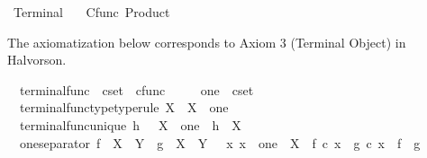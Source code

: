 %
\begin{isabellebody}%
%
%
\isadelimtheory
%
\endisadelimtheory
%
\isatagtheory
{}\isamarkupfalse%
\ Terminal\isanewline
\ \ \ Cfunc\ Product\isanewline
{}%
\endisatagtheory
{\isafoldtheory}%
%
\isadelimtheory
%
\endisadelimtheory
%
\isadelimdocument
%
\endisadelimdocument
%
\isatagdocument
%
\isamarkuptrue%
%
\endisatagdocument
{\isafolddocument}%
%
\isadelimdocument
%
\endisadelimdocument
%
\begin{isamarkuptext}%
The axiomatization below corresponds to Axiom 3 (Terminal Object) in Halvorson.%
\end{isamarkuptext}\isamarkuptrue%
\isamarkupfalse%
\isanewline
\ \ terminal{\isacharunderscore}{\kern0pt}func\ {\isacharcolon}{\kern0pt}{\isacharcolon}{\kern0pt}\ {\isachardoublequoteopen}cset\ {\isasymRightarrow}\ cfunc{\isachardoublequoteclose}\ {\isacharparenleft}{\kern0pt}{\isachardoublequoteopen}{\isasymbeta}\isactrlbsub {\isacharunderscore}{\kern0pt}\isactrlesub {\isachardoublequoteclose}\ {}{}{}{\isacharparenright}{\kern0pt}\ \isanewline
\ \ one\ {\isacharcolon}{\kern0pt}{\isacharcolon}{\kern0pt}\ {\isachardoublequoteopen}cset{\isachardoublequoteclose}\isanewline
{}\isanewline
\ \ terminal{\isacharunderscore}{\kern0pt}func{\isacharunderscore}{\kern0pt}type{\isacharbrackleft}{\kern0pt}type{\isacharunderscore}{\kern0pt}rule{\isacharbrackright}{\kern0pt}{\isacharcolon}{\kern0pt}\ {\isachardoublequoteopen}{\isasymbeta}\isactrlbsub X\isactrlesub \ {\isacharcolon}{\kern0pt}\ X\ {\isasymrightarrow}\ one{\isachardoublequoteclose}\ \isanewline
\ \ terminal{\isacharunderscore}{\kern0pt}func{\isacharunderscore}{\kern0pt}unique{\isacharcolon}{\kern0pt}\ {\isachardoublequoteopen}h\ {\isacharcolon}{\kern0pt}\ \ X\ {\isasymrightarrow}\ one\ {\isasymLongrightarrow}\ h\ {\isacharequal}{\kern0pt}\ {\isasymbeta}\isactrlbsub X\isactrlesub {\isachardoublequoteclose}\ \isanewline
\ \ one{\isacharunderscore}{\kern0pt}separator{\isacharcolon}{\kern0pt}\ {\isachardoublequoteopen}f\ {\isacharcolon}{\kern0pt}\ X\ {\isasymrightarrow}\ Y\ {\isasymLongrightarrow}\ g\ {\isacharcolon}{\kern0pt}\ X\ {\isasymrightarrow}\ Y\ {\isasymLongrightarrow}\ {\isacharparenleft}{\kern0pt}{\isasymAnd}\ x{\isachardot}{\kern0pt}\ x\ {\isacharcolon}{\kern0pt}\ one\ {\isasymrightarrow}\ X\ {\isasymLongrightarrow}\ f\ {\isasymcirc}\isactrlsub c\ x\ {\isacharequal}{\kern0pt}\ g\ {\isasymcirc}\isactrlsub c\ x{\isacharparenright}{\kern0pt}\ {\isasymLongrightarrow}\ f\ {\isacharequal}{\kern0pt}\ g{\isachardoublequoteclose}\isanewline

\end{isabellebody}

